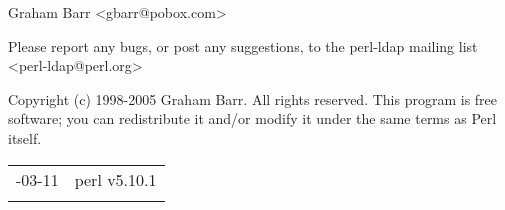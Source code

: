 \documentclass[]{article}
\begin{document}
Graham Barr \textless{}gbarr@pobox.com\textgreater{}

Please report any bugs, or post any suggestions, to the perl-ldap
mailing list \textless{}perl-ldap@perl.org\textgreater{}


Copyright (c) 1998-2005 Graham Barr. All rights reserved. This program
is free software; you can redistribute it and/or modify it under the
same terms as Perl itself.

\begin{longtable}[c]{@{}ll@{}}
\toprule\addlinespace
2010-03-11 & perl v5.10.1
\\\addlinespace
\bottomrule
\end{longtable}
\end{document}
